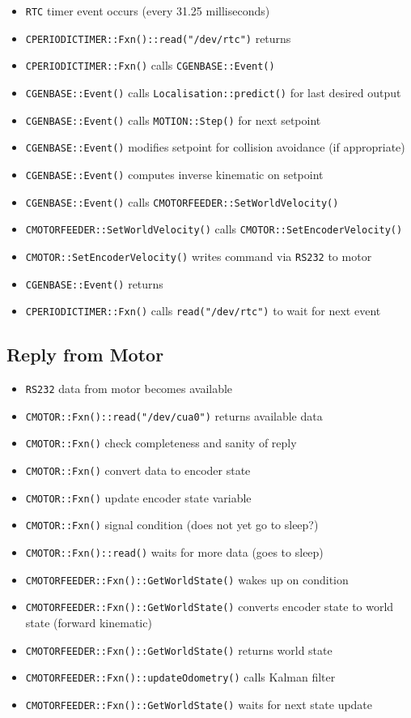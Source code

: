 \documentclass{article}
\begin{document}
\begin{itemize}\itemsep0ex
\item \texttt{RTC} timer event occurs (every 31.25 milliseconds)
\item \texttt{CPERIODICTIMER::Fxn()::read("/dev/rtc")} returns
\item \texttt{CPERIODICTIMER::Fxn()} calls \texttt{CGENBASE::Event()}
\item \texttt{CGENBASE::Event()} calls \texttt{Localisation::predict()} for
last desired output
\item \texttt{CGENBASE::Event()} calls \texttt{MOTION::Step()} for next
setpoint
\item \texttt{CGENBASE::Event()} modifies setpoint for collision avoidance (if
appropriate)
\item \texttt{CGENBASE::Event()} computes inverse kinematic on setpoint
\item \texttt{CGENBASE::Event()} calls
\texttt{CMOTORFEEDER::SetWorldVelocity()}
\item \texttt{CMOTORFEEDER::SetWorldVelocity()} calls
\texttt{CMOTOR::SetEncoderVelocity()}
\item \texttt{CMOTOR::SetEncoderVelocity()} writes command via \texttt{RS232}
to motor
\item \texttt{CGENBASE::Event()} returns
\item \texttt{CPERIODICTIMER::Fxn()} calls \texttt{read("/dev/rtc")} to wait
for next event
\end{itemize}

\subsection{Reply from Motor}

\begin{itemize}\itemsep0ex
\item \texttt{RS232} data from motor becomes available
\item \texttt{CMOTOR::Fxn()::read("/dev/cua0")} returns available data
\item \texttt{CMOTOR::Fxn()} check completeness and sanity of reply
\item \texttt{CMOTOR::Fxn()} convert data to encoder state
\item \texttt{CMOTOR::Fxn()} update encoder state variable
\item \texttt{CMOTOR::Fxn()} signal condition (does not yet go to sleep?)
\item \texttt{CMOTOR::Fxn()::read()} waits for more data (goes to sleep)
\item \texttt{CMOTORFEEDER::Fxn()::GetWorldState()} wakes up on condition
\item \texttt{CMOTORFEEDER::Fxn()::GetWorldState()} converts encoder state to
world state (forward kinematic)
\item \texttt{CMOTORFEEDER::Fxn()::GetWorldState()} returns world state
\item \texttt{CMOTORFEEDER::Fxn()::updateOdometry()} calls Kalman filter
\item \texttt{CMOTORFEEDER::Fxn()::GetWorldState()} waits for next state update
\end{itemize}
\end{document}
